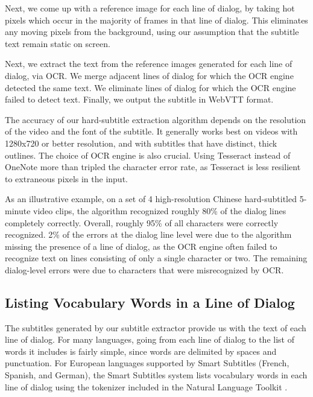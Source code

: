 \documentclass{sigchi}
\begin{document}
Next, we come up with a reference image for each line of dialog, by taking hot pixels which occur in the majority of frames in that line of dialog. This eliminates any moving pixels from the background, using our
assumption that the subtitle text remain static on screen.

Next, we extract the text from the reference images generated for each line of dialog, via OCR. We merge adjacent lines of dialog for which the OCR engine detected the same text. We eliminate lines of dialog for which the OCR engine failed to detect text. Finally, we output the subtitle in WebVTT format.

The accuracy of our hard-subtitle extraction algorithm depends on the resolution of the video and
the font of the subtitle. It generally works best on videos with 1280x720 or better resolution, and with subtitles that have distinct, thick outlines. The choice of OCR engine is also crucial. Using Tesseract instead of OneNote more than tripled the character error rate,
as Tesseract is less resilient to extraneous pixels in the input.

As an illustrative example, on a set of 4 high-resolution Chinese hard-subtitled 5-minute video clips, the algorithm recognized roughly 80\% of the dialog lines completely correctly. Overall, roughly 95\% of all characters were correctly recognized. 2\% of the errors at the dialog line level were due to the algorithm missing the presence of a line of dialog, as the OCR engine often failed to recognize text on lines consisting of only a single character or two. The remaining dialog-level errors were due to characters that were misrecognized by OCR.


\subsection{Listing Vocabulary Words in a Line of Dialog}

The subtitles generated by our subtitle extractor provide us with the text of each line of dialog. For many languages,
going from each line of dialog to the list of words it includes is fairly simple, since words are
delimited by spaces and punctuation. For European languages supported by
Smart Subtitles (French, Spanish, and German), the Smart Subtitles system lists
vocabulary words in each line of dialog using the
tokenizer included in the Natural
Language Toolkit \cite{nltk}.
\end{document}
